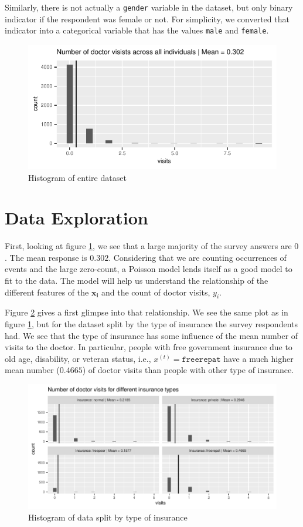 \documentclass[a4paper,11pt]{article}
\begin{document}
Similarly, there is not actually a \texttt{gender} variable in the dataset, but only binary indicator if the respondent was female or not. For simplicity, we converted that indicator into a categorical variable that has the values \texttt{male} and \texttt{female}.
\begin{figure}[h]
	\centering
	\includegraphics{../plots/histogram_of_visits.pdf}
	\caption{Histogram of entire dataset}
	\label{fig:hist_all}
\end{figure}

\section{Data Exploration}
First, looking at figure \ref{fig:hist_all}, we see that a large majority of the survey answers are $0$. The mean response is $0.302$. Considering that we are counting occurrences of events and the large zero-count, a Poisson model lends itself as a good model to fit to the data. The model will help us understand the relationship of the different features of the $\mathbf{x_i}$ and the count of doctor visits, $y_i$.

Figure \ref{fig:hist_insurances} gives a first glimpse into that relationship. We see the same plot as in figure \ref{fig:hist_all}, but for the dataset split by the type of insurance the survey respondents had. We see that the type of insurance has some influence of the mean number of visits to the doctor. In particular, people with free government insurance due to old age, disability, or veteran status, i.e., $x^{(t)} = \texttt{freerepat}$ have a much higher mean number ($0.4665$) of doctor visits than people with other type of insurance. 

\begin{figure}[h]
	\centering
\includegraphics{../plots/histograms_of_insurances.pdf}
		\caption{Histogram of data split by type of insurance}
			\label{fig:hist_insurances}
\end{figure}
\end{document}
